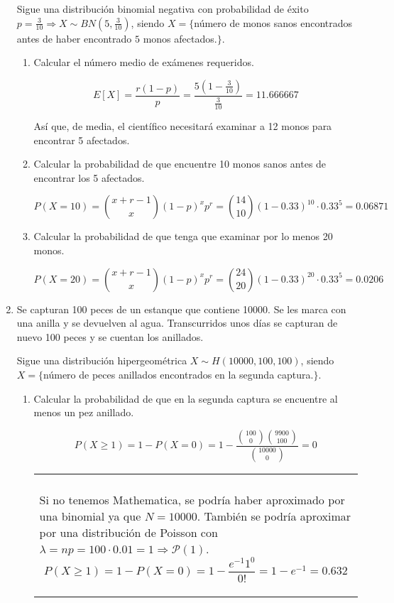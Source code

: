 \documentclass[11pt]{article}
\newcommand{\tick}{\textbf{\color{green}{ (\checkmark) }}}
\newcommand{\warning}{\textbf{\color{red}{ {\fontencoding{U}\fontfamily{futs}\selectfont\char 66\relax} }}}
\newenvironment{aclaration}    
{
\begin{center}
\begin{tabular}{|p{0.9\textwidth}|}
\hline \\ \warning
}{
\\\hline
\end{tabular} 
\end{center}
}
\begin{document}
\begin{enumerate}
Sigue una distribución binomial negativa con probabilidad de éxito $p=\frac{3}{10} \Longrightarrow X \sim BN(5,\frac{3}{10})$, siendo $X=\{$número de monos sanos encontrados antes de haber encontrado $5$ monos afectados.$\}$.


\begin{enumerate}
\item Calcular el número medio de exámenes requeridos.

\[
E[X]=\frac{r(1-p)}{p}=\frac{5(1-\frac{3}{10})}{\frac{3}{10}}=11.666667
\]

Así que, de media, el científico necesitará examinar a 12 monos para encontrar 5 afectados.

\item Calcular la probabilidad de que encuentre 10 monos sanos antes de encontrar los 5 afectados.

\[
P(X=10)=\binom{x+r-1}{x}(1-p)^xp^r=\binom{14}{10}(1-0.33)^{10}\cdot 0.33^5=0.06871
\]

\item Calcular la probabilidad de que tenga que examinar por lo menos 20 monos.

\[
P(X=20)=\binom{x+r-1}{x}(1-p)^xp^r=\binom{24}{20}(1-0.33)^{20}\cdot 0.33^5=0.0206
\]


\end{enumerate}

\item \tick Se capturan 100 peces de un estanque que contiene 10000. Se les marca con una anilla y se devuelven al agua. Transcurridos unos días se capturan de nuevo 100 peces y se cuentan los anillados.

Sigue una distribución hipergeométrica  $X \sim H(10000, 100, 100)$, siendo $X=\{$número de peces anillados encontrados en la segunda captura.$\}$.

\begin{enumerate}

\item Calcular la probabilidad de que en la segunda captura se encuentre al menos un pez anillado.

\[
P(X\geq 1)=1 - P(X=0) =  1 - \frac{\binom{100}{0}\binom{9900}{100}}{\binom{10000}{0}}=0
\]

\begin{aclaration}
Si no tenemos Mathematica, se podría haber aproximado por una binomial ya que $N=10000$. También se podría aproximar por una distribución de Poisson con $\lambda=np=100\cdot  0.01=1\Longrightarrow \mathcal{P}(1)$.
\[
P(X\geq 1)= 1-P(X=0)=1-\frac{e^{-1}1^0}{0!}=1-e^{-1}=0.632
\]
\end{aclaration}


\end{enumerate}
\end{enumerate}
\end{document}
